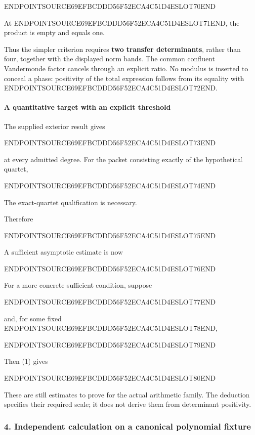 ENDPOINTSOURCE69EFBCDDD56F52ECA4C51D4ESLOT70END

At ENDPOINTSOURCE69EFBCDDD56F52ECA4C51D4ESLOT71END, the product is empty and equals one.

Thus the simpler criterion requires \textbf{two transfer determinants}, rather than four, together with the displayed norm bands. The common confluent Vandermonde factor cancels through an explicit ratio. No modulus is inserted to conceal a phase: positivity of the total expression follows from its equality with ENDPOINTSOURCE69EFBCDDD56F52ECA4C51D4ESLOT72END.

\paragraph{A quantitative target with an explicit threshold}\label{endpoint-user_product_original--a-quantitative-target-with-an-explicit-threshold}

The supplied exterior result gives

ENDPOINTSOURCE69EFBCDDD56F52ECA4C51D4ESLOT73END

at every admitted degree. For the packet consisting exactly of the hypothetical quartet,

ENDPOINTSOURCE69EFBCDDD56F52ECA4C51D4ESLOT74END

The exact-quartet qualification is necessary.

Therefore

ENDPOINTSOURCE69EFBCDDD56F52ECA4C51D4ESLOT75END

A sufficient asymptotic estimate is now

ENDPOINTSOURCE69EFBCDDD56F52ECA4C51D4ESLOT76END

For a more concrete sufficient condition, suppose

ENDPOINTSOURCE69EFBCDDD56F52ECA4C51D4ESLOT77END

and, for some fixed ENDPOINTSOURCE69EFBCDDD56F52ECA4C51D4ESLOT78END,

ENDPOINTSOURCE69EFBCDDD56F52ECA4C51D4ESLOT79END

Then (1) gives

ENDPOINTSOURCE69EFBCDDD56F52ECA4C51D4ESLOT80END

These are still estimates to prove for the actual arithmetic family. The deduction specifies their required scale; it does not derive them from determinant positivity.

\subsubsection{4. Independent calculation on a canonical polynomial fixture}\label{endpoint-user_product_original--independent-calculation-on-a-canonical-polynomial-fixture}

